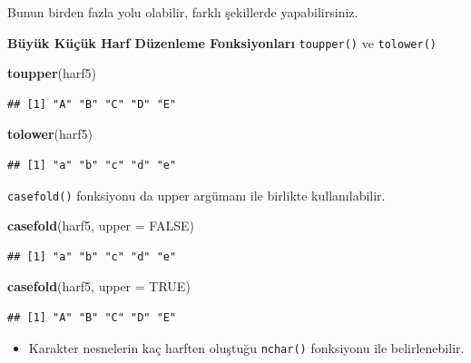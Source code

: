 \documentclass[
  oneside]{book}
\newenvironment{Shaded}{\begin{snugshade}}{\end{snugshade}}
\newcommand{\AttributeTok}[1]{\textcolor[rgb]{0.13,0.29,0.53}{#1}}
\newcommand{\ConstantTok}[1]{\textcolor[rgb]{0.56,0.35,0.01}{#1}}
\newcommand{\FunctionTok}[1]{\textcolor[rgb]{0.13,0.29,0.53}{\textbf{#1}}}
\newcommand{\NormalTok}[1]{#1}
\providecommand{\tightlist}{%
  \setlength{\itemsep}{0pt}\setlength{\parskip}{0pt}}
\begin{document}
Bunun birden fazla yolu olabilir, farklı şekillerde yapabilirsiniz.

\textbf{Büyük Küçük Harf Düzenleme Fonksiyonları} \texttt{toupper()} ve \texttt{tolower()}

\begin{Shaded}
\begin{Highlighting}[]
\FunctionTok{toupper}\NormalTok{(harf5)}
\end{Highlighting}
\end{Shaded}

\begin{verbatim}
## [1] "A" "B" "C" "D" "E"
\end{verbatim}

\begin{Shaded}
\begin{Highlighting}[]
\FunctionTok{tolower}\NormalTok{(harf5)}
\end{Highlighting}
\end{Shaded}

\begin{verbatim}
## [1] "a" "b" "c" "d" "e"
\end{verbatim}

\texttt{casefold()} fonksiyonu da upper argümanı ile birlikte kullanılabilir.

\begin{Shaded}
\begin{Highlighting}[]
\FunctionTok{casefold}\NormalTok{(harf5, }\AttributeTok{upper =} \ConstantTok{FALSE}\NormalTok{)}
\end{Highlighting}
\end{Shaded}

\begin{verbatim}
## [1] "a" "b" "c" "d" "e"
\end{verbatim}

\begin{Shaded}
\begin{Highlighting}[]
\FunctionTok{casefold}\NormalTok{(harf5, }\AttributeTok{upper =} \ConstantTok{TRUE}\NormalTok{)}
\end{Highlighting}
\end{Shaded}

\begin{verbatim}
## [1] "A" "B" "C" "D" "E"
\end{verbatim}

\begin{itemize}
\tightlist
\item
  Karakter nesnelerin kaç harften oluştuğu \texttt{nchar()} fonksiyonu ile belirlenebilir.
\end{itemize}
\end{document}
